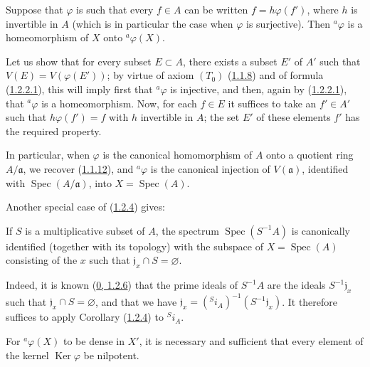 \begin{corollary}[1.2.4]
\label{I.1.2.4}
Suppose that $\varphi$ is such that every $f\in A$ can be written
$f=h\varphi(f')$, where $h$ is invertible in $A$ (which is in particular
the case when $\varphi$ is surjective). Then ${}^a\varphi$ is a
homeomorphism of $X$ onto ${}^a\varphi(X)$.
\end{corollary}

Let us show that for every subset $E\subset A$, there exists a subset $E'$
of $A'$ such that $V(E)=V(\varphi(E'))$; by virtue of axiom $(T_0)$
(\hyperref[I.1.1.8]{1.1.8}) and of formula
(\hyperref[I.1.2.2.1]{1.2.2.1}), this will imply first that
${}^a\varphi$ is injective, and then, again by
(\hyperref[I.1.2.2.1]{1.2.2.1}), that ${}^a\varphi$ is a
homeomorphism. Now, for each $f\in E$ it suffices to take an $f'\in A'$
such that $h\varphi(f')=f$ with $h$ invertible in $A$; the set $E'$ of these
elements $f'$ has the required property.

\begin{env}[1.2.5]
\label{I.1.2.5}
In particular, when $\varphi$ is the canonical homomorphism of $A$ onto a
quotient ring $A/\mathfrak{a}$, we recover
(\hyperref[I.1.1.12]{1.1.12}), and ${}^a\varphi$ is the canonical
injection of $V(\mathfrak{a})$, identified with
$\operatorname{Spec}(A/\mathfrak{a})$, into $X=\operatorname{Spec}(A)$.
\end{env}

Another special case of (\hyperref[I.1.2.4]{1.2.4}) gives:

\begin{corollary}[1.2.6]
\label{I.1.2.6}
If $S$ is a multiplicative subset of $A$, the spectrum
$\operatorname{Spec}(S^{-1}A)$ is canonically identified (together with its
topology) with the subspace of $X=\operatorname{Spec}(A)$ consisting of the
$x$ such that $\mathfrak{j}_x\cap S=\varnothing$.
\end{corollary}

Indeed, it is known (\hyperref[0.1.2.6]{0, 1.2.6}) that the prime ideals
of $S^{-1}A$ are the ideals $S^{-1}\mathfrak{j}_x$ such that
$\mathfrak{j}_x\cap S=\varnothing$, and that we have
$\mathfrak{j}_x=({}^S i_A)^{-1}(S^{-1}\mathfrak{j}_x)$. It therefore
suffices to apply Corollary (\hyperref[I.1.2.4]{1.2.4}) to ${}^S i_A$.

\begin{corollary}[1.2.7]
\label{I.1.2.7}
For ${}^a\varphi(X)$ to be dense in $X'$, it is necessary and sufficient
that every element of the kernel $\operatorname{Ker}\varphi$ be nilpotent.
\end{corollary}


